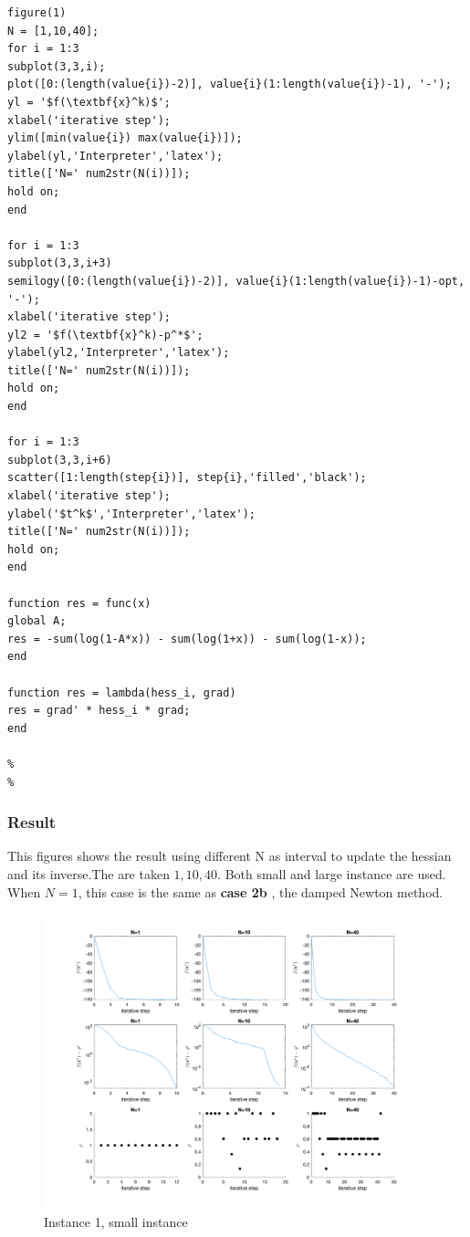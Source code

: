 \documentclass[]{article}
\begin{document}
\begin{lstlisting}
figure(1)
N = [1,10,40];
for i = 1:3
subplot(3,3,i);
plot([0:(length(value{i})-2)], value{i}(1:length(value{i})-1), '-');
yl = '$f(\textbf{x}^k)$';
xlabel('iterative step');
ylim([min(value{i}) max(value{i})]);
ylabel(yl,'Interpreter','latex');
title(['N=' num2str(N(i))]);
hold on;
end

for i = 1:3
subplot(3,3,i+3)
semilogy([0:(length(value{i})-2)], value{i}(1:length(value{i})-1)-opt, '-');
xlabel('iterative step');
yl2 = '$f(\textbf{x}^k)-p^*$';
ylabel(yl2,'Interpreter','latex');
title(['N=' num2str(N(i))]);
hold on;
end

for i = 1:3
subplot(3,3,i+6)
scatter([1:length(step{i})], step{i},'filled','black');
xlabel('iterative step'); 
ylabel('$t^k$','Interpreter','latex');
title(['N=' num2str(N(i))]);
hold on;
end

function res = func(x)
global A;
res = -sum(log(1-A*x)) - sum(log(1+x)) - sum(log(1-x));
end

function res = lambda(hess_i, grad)
res = grad' * hess_i * grad;
end

%
%
\end{lstlisting}
\subsubsection{Result}
This figures shows the result using different N as interval to update the hessian and its inverse.The are taken $1,10,40$. Both small and large instance are used. When $N=1$, this case is the same as \textbf{case 2b} , the damped Newton method.
\begin{figure}[H]
	\centering
	\includegraphics[width=350pt,keepaspectratio]{dampN1_small}
	\caption{Instance 1, small instance}
\end{figure}
\end{document}
